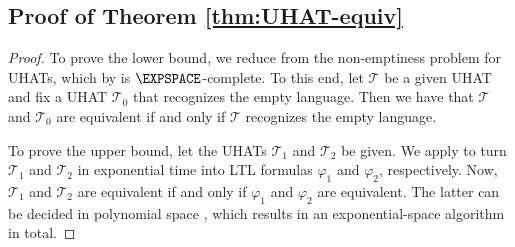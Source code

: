 \documentclass{article} %
\newcommand{\trans}{\mathcal{T}}
\begin{document}
\subsection{Proof of Theorem \ref{thm:UHAT-equiv}}\label{app:UHAT-equiv}
\thmUHATequiv*
\begin{proof}
To prove the lower bound, we reduce from the non-emptiness problem for UHATs,
which by  is $\EXPSPACE$-complete.
To this end, let $\trans$ be a given UHAT and fix a UHAT $\trans_0$ that recognizes the empty language.
Then we have that $\trans$ and $\trans_0$ are equivalent if and only if $\trans$ recognizes the empty language.

To prove the upper bound, let the UHATs $\trans_1$ and $\trans_2$ be given.
We apply  to turn $\trans_1$ and $\trans_2$ in exponential time
into LTL formulas $\varphi_1$ and $\varphi_2$, respectively.
Now, $\trans_1$ and $\trans_2$ are equivalent if and only if $\varphi_1$ and $\varphi_2$ are equivalent.
The latter can be decided in polynomial space \citep{SistlaC85}, which results in an exponential-space algorithm in total.
\end{proof}
\end{document}
